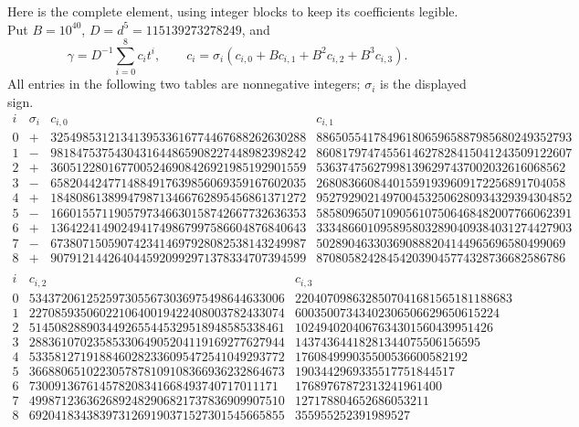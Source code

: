 Here is the complete element, using integer blocks to keep its
coefficients legible.  Put \(B=10^{40}\), \(D=d^5=115139273278249\), and
\[
 \gamma=D^{-1}\sum_{i=0}^{8}c_i t^i,\qquad
 c_i=\sigma_i(c_{i,0}+B c_{i,1}+B^2c_{i,2}+B^3c_{i,3}).
\tag{A.156.4}
\]
All entries in the following two tables are nonnegative integers;
\(\sigma_i\) is the displayed sign.
{\scriptsize
\[
\begin{array}{c|c|r|r}
i&\sigma_i&c_{i,0}&c_{i,1}\\\hline
0&+&3254985312134139533616774467688262630288&8865055417849618065965887985680249352793\\
1&-&9818475375430431644865908227448982398242&8608179747455614627828415041243509122607\\
2&+&3605122801677005246908426921985192901559&536374756279981396297437002032616068562\\
3&-&6582044247714884917639856069359167602035&268083660844015591939609172256891704058\\
4&+&1848086138994798713466762895456861371272&9527929021497004532506280934329394304852\\
5&-&1660155711905797346630158742667732636353&5858096507109056107506468482007766062391\\
6&+&1364224149024941749867997586604876840643&3334866010958958032890409384031274427903\\
7&-&6738071505907423414697928082538143249987&502890463303690888204144965696580499069\\
8&+&9079121442640445920992971378334707394599&870805824284542039045774328736682586786\\
\end{array}
\tag{A.156.5}
\]
}
{\scriptsize
\[
\begin{array}{c|r|r}
i&c_{i,2}&c_{i,3}\\\hline
0&5343720612525973055673036975498644633006&2204070986328507041681565181188683\\
1&2270859350602210640019422408003782433074&60035007343402306506629650615224\\
2&5145082889034492655445329518948585338461&1024940204067634301560439951426\\
3&2883610702358533064905204119169277627944&14374364418281344075506156595\\
4&5335812719188460282336095472541049293772&176084999035500536600582192\\
5&3668806510223057878109108366936232864673&1903442969335517751844517\\
6&730091367614578208341668493740717011171&17689767872313241961400\\
7&4998712363626892482906821737836909907510&127178804652686053211\\
8&6920418343839731269190371527301545665855&355955252391989527\\
\end{array}
\tag{A.156.6}
\]
}

